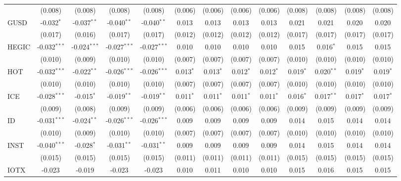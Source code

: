 \begin{table}[!htbp]
\begin{tabular}{@{\extracolsep{5pt}}lcccccccccccc}
  & (0.008) & (0.008) & (0.008) & (0.008) & (0.006) & (0.006) & (0.006) & (0.006) & (0.008) & (0.008) & (0.008) & (0.008) \\
 GUSD & -0.032$^{*}$ & -0.037$^{**}$ & -0.040$^{**}$ & -0.040$^{**}$ & 0.013$^{}$ & 0.013$^{}$ & 0.013$^{}$ & 0.013$^{}$ & 0.021$^{}$ & 0.021$^{}$ & 0.020$^{}$ & 0.020$^{}$ \\
  & (0.017) & (0.016) & (0.017) & (0.017) & (0.012) & (0.012) & (0.012) & (0.012) & (0.017) & (0.017) & (0.017) & (0.017) \\
 HEGIC & -0.032$^{***}$ & -0.024$^{***}$ & -0.027$^{***}$ & -0.027$^{***}$ & 0.010$^{}$ & 0.010$^{}$ & 0.010$^{}$ & 0.010$^{}$ & 0.015$^{}$ & 0.016$^{*}$ & 0.015$^{}$ & 0.015$^{}$ \\
  & (0.010) & (0.009) & (0.010) & (0.010) & (0.007) & (0.007) & (0.007) & (0.007) & (0.010) & (0.010) & (0.010) & (0.010) \\
 HOT & -0.032$^{***}$ & -0.022$^{**}$ & -0.026$^{***}$ & -0.026$^{***}$ & 0.013$^{*}$ & 0.013$^{*}$ & 0.012$^{*}$ & 0.012$^{*}$ & 0.019$^{*}$ & 0.020$^{**}$ & 0.019$^{*}$ & 0.019$^{*}$ \\
  & (0.010) & (0.010) & (0.010) & (0.010) & (0.007) & (0.007) & (0.007) & (0.007) & (0.010) & (0.010) & (0.010) & (0.010) \\
 ICE & -0.028$^{***}$ & -0.015$^{*}$ & -0.019$^{**}$ & -0.019$^{**}$ & 0.011$^{*}$ & 0.011$^{*}$ & 0.011$^{*}$ & 0.011$^{*}$ & 0.016$^{*}$ & 0.017$^{**}$ & 0.017$^{*}$ & 0.017$^{*}$ \\
  & (0.009) & (0.008) & (0.009) & (0.009) & (0.006) & (0.006) & (0.006) & (0.006) & (0.009) & (0.009) & (0.009) & (0.009) \\
 ID & -0.031$^{***}$ & -0.024$^{**}$ & -0.026$^{***}$ & -0.026$^{***}$ & 0.009$^{}$ & 0.009$^{}$ & 0.009$^{}$ & 0.009$^{}$ & 0.014$^{}$ & 0.015$^{}$ & 0.014$^{}$ & 0.014$^{}$ \\
  & (0.010) & (0.009) & (0.010) & (0.010) & (0.007) & (0.007) & (0.007) & (0.007) & (0.010) & (0.010) & (0.010) & (0.010) \\
 INST & -0.040$^{***}$ & -0.028$^{*}$ & -0.031$^{**}$ & -0.031$^{**}$ & 0.009$^{}$ & 0.009$^{}$ & 0.009$^{}$ & 0.009$^{}$ & 0.014$^{}$ & 0.015$^{}$ & 0.014$^{}$ & 0.014$^{}$ \\
  & (0.015) & (0.015) & (0.015) & (0.015) & (0.011) & (0.011) & (0.011) & (0.011) & (0.015) & (0.015) & (0.015) & (0.015) \\
 IOTX & -0.023$^{}$ & -0.019$^{}$ & -0.023$^{}$ & -0.023$^{}$ & 0.010$^{}$ & 0.011$^{}$ & 0.010$^{}$ & 0.010$^{}$ & 0.015$^{}$ & 0.016$^{}$ & 0.015$^{}$ & 0.015$^{}$ \\

\end{tabular}
\end{table}
